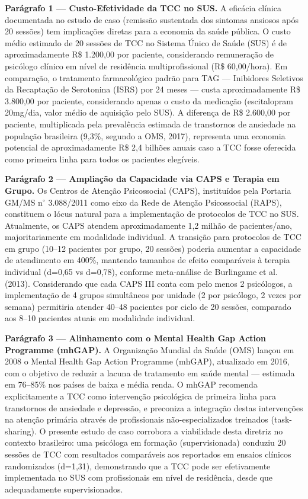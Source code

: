 \documentclass[12pt,a4paper]{article}
\begin{document}
\textbf{Parágrafo 1 — Custo-Efetividade da TCC no SUS.} A eficácia clínica documentada no estudo de caso (remissão sustentada dos sintomas ansiosos após 20 sessões) tem implicações diretas para a economia da saúde pública. O custo médio estimado de 20 sessões de TCC no Sistema Único de Saúde (SUS) é de aproximadamente R\$ 1.200,00 por paciente, considerando remuneração de psicólogo clínico em nível de residência multiprofissional (R\$ 60,00/hora). Em comparação, o tratamento farmacológico padrão para TAG --- Inibidores Seletivos da Recaptação de Serotonina (ISRS) por 24 meses --- custa aproximadamente R\$ 3.800,00 por paciente, considerando apenas o custo da medicação (escitalopram 20mg/dia, valor médio de aquisição pelo SUS). A diferença de R\$ 2.600,00 por paciente, multiplicada pela prevalência estimada de transtornos de ansiedade na população brasileira (9,3\%, segundo a OMS, 2017), representa uma economia potencial de aproximadamente R\$ 2,4 bilhões anuais caso a TCC fosse oferecida como primeira linha para todos os pacientes elegíveis.

\textbf{Parágrafo 2 — Ampliação da Capacidade via CAPS e Terapia em Grupo.} Os Centros de Atenção Psicossocial (CAPS), instituídos pela Portaria GM/MS n$^{\circ}$ 3.088/2011 como eixo da Rede de Atenção Psicossocial (RAPS), constituem o lócus natural para a implementação de protocolos de TCC no SUS. Atualmente, os CAPS atendem aproximadamente 1,2 milhão de pacientes/ano, majoritariamente em modalidade individual. A transição para protocolos de TCC em grupo (10--12 pacientes por grupo, 20 sessões) poderia aumentar a capacidade de atendimento em 400\%, mantendo tamanhos de efeito comparáveis à terapia individual (d=0,65 vs d=0,78), conforme meta-análise de Burlingame et al. (2013). Considerando que cada CAPS III conta com pelo menos 2 psicólogos, a implementação de 4 grupos simultâneos por unidade (2 por psicólogo, 2 vezes por semana) permitiria atender 40--48 pacientes por ciclo de 20 sessões, comparado aos 8--10 pacientes atuais em modalidade individual.

\textbf{Parágrafo 3 — Alinhamento com o Mental Health Gap Action Programme (mhGAP).} A Organização Mundial da Saúde (OMS) lançou em 2008 o Mental Health Gap Action Programme (mhGAP), atualizado em 2016, com o objetivo de reduzir a lacuna de tratamento em saúde mental --- estimada em 76--85\% nos países de baixa e média renda. O mhGAP recomenda explicitamente a TCC como intervenção psicológica de primeira linha para transtornos de ansiedade e depressão, e preconiza a integração destas intervenções na atenção primária através de profissionais não-especializados treinados (task-sharing). O presente estudo de caso corrobora a viabilidade desta diretriz no contexto brasileiro: uma psicóloga em formação (supervisionada) conduziu 20 sessões de TCC com resultados comparáveis aos reportados em ensaios clínicos randomizados (d=1,31), demonstrando que a TCC pode ser efetivamente implementada no SUS com profissionais em nível de residência, desde que adequadamente supervisionados.
\end{document}
